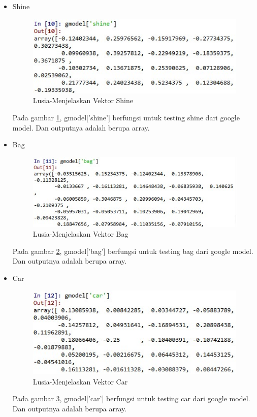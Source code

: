 \begin{enumerate}
\begin{enumerate}
\begin{itemize}
				\item Shine
					\begin{figure}[ht]
					\centering
					\includegraphics[scale=0.4]{figures/chap5f.jpg}
					\caption{Lusia-Menjelaskan Vektor Shine}
					\label{5b7}
					\end{figure}
					\par Pada gambar \ref{5b7}, gmodel['shine'] berfungsi untuk testing shine dari google model. Dan outputnya adalah berupa array. 
					
				\item Bag
					\begin{figure}[ht]
					\centering
					\includegraphics[scale=0.45]{figures/chap5g.jpg}
					\caption{Lusia-Menjelaskan Vektor Bag}
					\label{5b8}
					\end{figure}
					\par Pada gambar \ref{5b8}, gmodel['bag'] berfungsi untuk testing bag dari google model. Dan outputnya adalah berupa array. 
					
				\item Car
					\begin{figure}[ht]
					\centering
					\includegraphics[scale=0.45]{figures/chap5h.jpg}
					\caption{Lusia-Menjelaskan Vektor Car}
					\label{5b9}
					\end{figure}
					\par Pada gambar \ref{5b9}, gmodel['car'] berfungsi untuk testing car dari google model. Dan outputnya adalah berupa array. 
					

\end{itemize}
\end{enumerate}
\end{enumerate}
